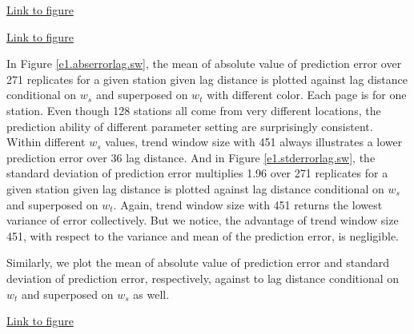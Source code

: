 \begin{framed}
\begin{center}
  \href{../plots/a1950/E1/tmax.absmeans.vs.lag.sw.pdf}{Link to figure}
  \label{e1.abserrorlag.sw}
\end{center}
\end{framed}

\begin{framed}
\begin{center}
  \href{../plots/a1950/E1/tmax.std.vs.lag.sw.pdf}{Link to figure}
  \label{e1.stderrorlag.sw}
\end{center}
\end{framed}

In Figure \href{../plots/tmax.absmeans.vs.lag.sw.pdf}{\ref*{e1.abserrorlag.sw}}, 
the mean of absolute value of prediction error over 271 replicates for a given
station given lag distance is plotted against lag distance conditional on $w_s$ 
and superposed on $w_t$ with different color. Each page is for one station. Even
though 128 stations all come from very different locations, the prediction ability
of different parameter setting are surprisingly consistent. Within different 
$w_s$ values, trend window size with 451 always illustrates a lower prediction
error over 36 lag distance.
And in Figure \href{../plots/tmax.std.vs.lag.sw.pdf}{\ref*{e1.stderrorlag.sw}},
the standard deviation of prediction error multiplies 1.96 over 271 replicates 
for a given 
station given lag distance is plotted against lag distance conditional on $w_s$
and superposed on $w_t$. Again, trend window size with 451 returns the lowest
variance of error collectively. 
But we notice, the advantage of trend window size 451, with respect to the 
variance and mean of the prediction error, is negligible. 

Similarly, we plot the mean of absolute value of prediction error and standard 
deviation of prediction error, respectively, against to lag distance conditional 
on $w_t$ and superposed on $w_s$ as well.

\begin{framed}
\begin{center}
  \href{../plots/a1950/E1/tmax.absmeans.vs.lag.tw.pdf}{Link to figure}
  \label{e1.abserrorlag.tw}
\end{center}
\end{framed}

